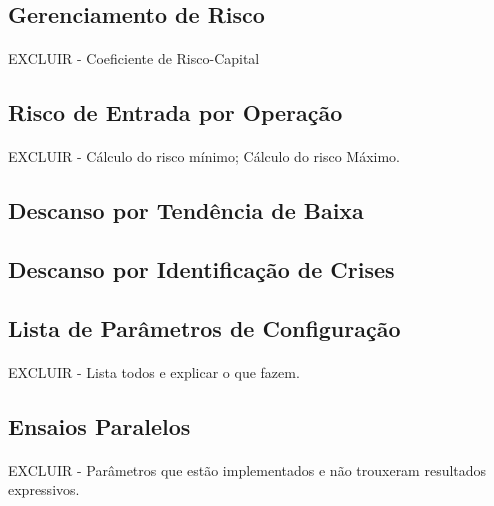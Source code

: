 \subsection{Gerenciamento de Risco}
\paragraph{} EXCLUIR - Coeficiente de Risco-Capital

\subsection{Risco de Entrada por Operação}
\paragraph{} EXCLUIR - Cálculo do risco mínimo; Cálculo do risco Máximo.

\subsection{Descanso por Tendência de Baixa}
\label{downtrend_halt}
\paragraph{}

\subsection{Descanso por Identificação de Crises}
\label{crisis_halt}
\paragraph{}

\subsection{Lista de Parâmetros de Configuração}
\paragraph{} EXCLUIR - Lista todos e explicar o que fazem.

\subsection{Ensaios Paralelos}
\paragraph{} EXCLUIR - Parâmetros que estão implementados e não trouxeram resultados expressivos.




